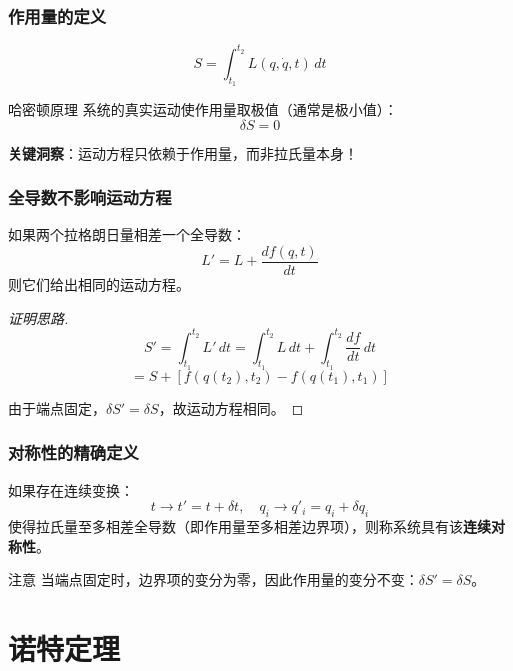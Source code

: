 \documentclass[xcolor=dvipsnames]{ctexbeamer}
\begin{document}
\begin{frame}
\frametitle{作用量的定义}
\begin{definition}[作用量]
$$S = \int_{t_1}^{t_2} L(q, \dot{q}, t) \, dt$$
\end{definition}

\pause

\begin{block}{哈密顿原理}
系统的真实运动使作用量取极值（通常是极小值）：
$$\delta S = 0$$
\end{block}

\pause

\textbf{关键洞察}：运动方程只依赖于作用量，而非拉氏量本身！
\end{frame}

\begin{frame}
\frametitle{全导数不影响运动方程}
\begin{theorem}
如果两个拉格朗日量相差一个全导数：
$$L' = L + \frac{df(q, t)}{dt}$$
则它们给出相同的运动方程。
\end{theorem}

\pause

\begin{proof}[证明思路]
$$S' = \int_{t_1}^{t_2} L' \, dt = \int_{t_1}^{t_2} L \, dt + \int_{t_1}^{t_2} \frac{df}{dt} \, dt$$
$$= S + [f(q(t_2), t_2) - f(q(t_1), t_1)]$$

由于端点固定，$\delta S' = \delta S$，故运动方程相同。
\end{proof}
\end{frame}

\begin{frame}
\frametitle{对称性的精确定义}
\begin{definition}[连续对称性]
如果存在连续变换：
$$t \to t' = t + \delta t, \quad q_i \to q'_i = q_i + \delta q_i$$
使得拉氏量至多相差全导数（即作用量至多相差边界项），则称系统具有该\textbf{连续对称性}。
\end{definition}

\pause

\begin{alertblock}{注意}
当端点固定时，边界项的变分为零，因此作用量的变分不变：$\delta S' = \delta S$。
\end{alertblock}
\end{frame}

\section{诺特定理}
\end{document}
